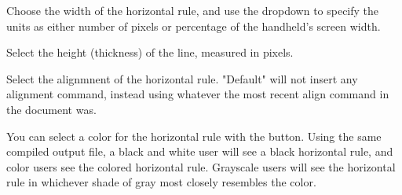 
 Choose the width of the horizontal rule, and 
use the dropdown to specify the units as either number of pixels or 
percentage of the handheld's screen width.  

 Select the height (thickness) of the line, 
measured in pixels.
  
 Select the alignmnent of the horizontal 
rule. "Default" will not insert any alignment command, instead using whatever 
the most recent align command in the document was.
 
 You can select a color for the horizontal rule 
with the  button. Using the same compiled 
output file, a black and white user will see a black horizontal rule, and 
color users see the colored horizontal rule. Grayscale users will see the 
horizontal rule in whichever shade of gray most closely resembles the color.  



%
%

